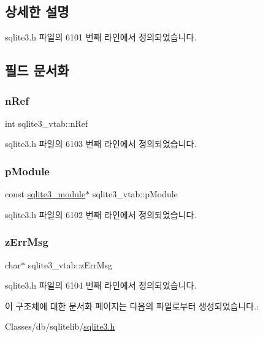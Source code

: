 \subsection{상세한 설명}


sqlite3.\+h 파일의 6101 번째 라인에서 정의되었습니다.



\subsection{필드 문서화}
\mbox{\label{structsqlite3__vtab_ab3c80d385849bdd82363a0df7d6fcba8}} 
\subsubsection{\texorpdfstring{n\+Ref}{nRef}}
{\footnotesize\ttfamily int sqlite3\+\_\+vtab\+::n\+Ref}



sqlite3.\+h 파일의 6103 번째 라인에서 정의되었습니다.

\mbox{\label{structsqlite3__vtab_a4ef8198ca611b73a9b23054dd1e91e2b}} 
\subsubsection{\texorpdfstring{p\+Module}{pModule}}
{\footnotesize\ttfamily const \hyperlink{structsqlite3__module}{sqlite3\+\_\+module}$\ast$ sqlite3\+\_\+vtab\+::p\+Module}



sqlite3.\+h 파일의 6102 번째 라인에서 정의되었습니다.

\mbox{\label{structsqlite3__vtab_afc50eadfdd7cef876633d460deba48d6}} 
\subsubsection{\texorpdfstring{z\+Err\+Msg}{zErrMsg}}
{\footnotesize\ttfamily char$\ast$ sqlite3\+\_\+vtab\+::z\+Err\+Msg}



sqlite3.\+h 파일의 6104 번째 라인에서 정의되었습니다.



이 구조체에 대한 문서화 페이지는 다음의 파일로부터 생성되었습니다.\+:\begin{DoxyCompactItemize}
\item 
Classes/db/sqlitelib/\hyperlink{sqlite3_8h}{sqlite3.\+h}\end{DoxyCompactItemize}

